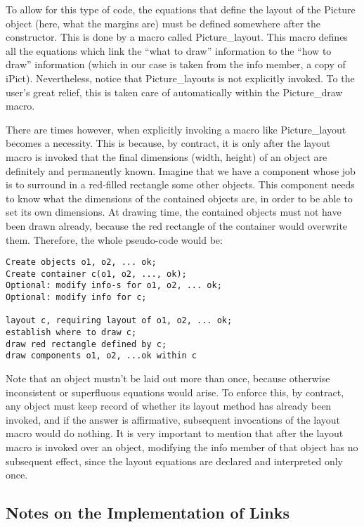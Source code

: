 \documentclass{article}
\newcommand{\code}{\ttfamily}
\begin{document}
To allow for this type of code, the equations that define the layout of the {\code Picture} object (here, what the margins are)
must be defined somewhere after the constructor. This is done by a macro called {\code Picture\_layout}.
This macro defines all the equations which link the ``what to draw'' information to the ``how to draw''
information (which in our case is taken from the {\code info} member, a copy of {\code iPict}).
Nevertheless, notice that {\code Picture\_layouts} is not explicitly invoked. To the user's
great relief, this is taken care of automatically within the {\code Picture\_draw} macro.

There are times however, when explicitly invoking a macro like {\code Picture\_layout}
becomes a necessity. This is because, by contract, it is only after the {\code layout}
macro is invoked that the final dimensions (width, height) of an object are
definitely and permanently known. Imagine that we have a component whose job is to
surround in a red-filled rectangle some other objects. This component
needs to know what the dimensions of the contained objects are, in order to be able to set
its own dimensions. At drawing time, the contained objects must not have been drawn already,
because the red rectangle of the container would overwrite them.
Therefore, the whole pseudo-code would be:
\begin{verbatim}
Create objects o1, o2, ... ok;
Create container c(o1, o2, ..., ok);
Optional: modify info-s for o1, o2, ... ok;
Optional: modify info for c;

layout c, requiring layout of o1, o2, ... ok;
establish where to draw c;
draw red rectangle defined by c;
draw components o1, o2, ...ok within c
\end{verbatim}

Note that an object mustn't be laid out more than once, because otherwise
inconsistent or superfluous equations would arise. To enforce this, by contract,
any object must keep record of whether its layout method has already been invoked,
and if the answer is affirmative, subsequent invocations of the layout macro would
do nothing. It is very important to mention that after the {\code layout} macro is
invoked over an object, modifying the {\code info} member of that object has
no subsequent effect, since the layout equations are declared and interpreted only once.

\subsection{Notes on the Implementation of Links}
\end{document}
